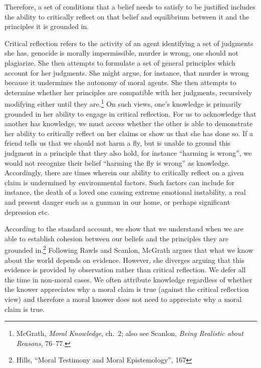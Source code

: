 \documentclass[phdthesis,12pt,final,a4paper]{wuthesis}
\theoremstyle{definition}
\theoremstyle{definition}
\theoremstyle{definition}
\theoremstyle{definition}
\theoremstyle{remark}
\begin{document}
\label{refl-equi}
Therefore, a set of conditions that a belief needs to satisfy to be justified includes the ability to critically reflect on that belief and equilibrium between it and the principles it is grounded in.

Critical reflection refers to the activity of an agent identifying a set of judgments she has, genocide is morally impermissible, murder is wrong, one should not plagiarize. She then attempts to formulate a set of general principles which account for her judgments. She might argue, for instance, that murder is wrong because it undermines the autonomy of moral agents. She then attempts to determine whether her principles are compatible with her judgments, recursively modifying either until they are.\footnote{McGrath, \emph{Moral {Knowledge}}, ch.~2; also see Scanlon, \emph{Being Realistic about Reasons}, 76--77.} On such views, one's knowledge is primarily grounded in her ability to engage in critical reflection. For us to acknowledge that another has knowledge, we must access whether the other is able to demonstrate her ability to critically reflect on her claims or show us that she has done so. If a friend tells us that we should not harm a fly, but is unable to ground this judgment in a principle that they also hold, for instance ``harming is wrong'', we would not recognize their belief ``harming the fly is wrong'' as knowledge. Accordingly, there are times wherein our ability to critically reflect on a given claim is undermined by environmental factors. Such factors can include for instance, the death of a loved one causing extreme emotional instability, a real and present danger such as a gunman in our home, or perhaps significant depression etc.

According to the standard account, we show that we understand when we are able to establish cohesion between our beliefs and the principles they are grounded in.\footnote{Hills, {``Moral Testimony and Moral Epistemology''}, 167} Following Rawls and Scanlon, McGrath argues that what we know about the world depends on evidence. However, she diverges arguing that this evidence is provided by observation rather than critical reflection. We defer all the time in non-moral cases. We often attribute knowledge regardless of whether the knower appreciates why a moral claim is true (against the critical reflection view) and therefore a moral knower does not need to appreciate why a moral claim is true.
\end{document}
